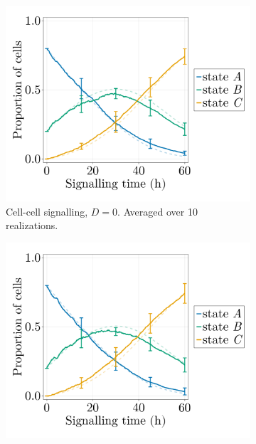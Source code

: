 \begin{figure}[ht]
    \centering
    \begin{subfigure}{0.47\textwidth}
        \centering
        \includegraphics[width=\textwidth]{figures/406/406-proportions-diffgrow-simulation-10ite-fp0-cellcell.png}
        \caption{Cell-cell signalling, $D=0$. Averaged over 10 realizations.}
    \end{subfigure}
    \hfill
    \begin{subfigure}{0.47\textwidth}
        \centering
        \includegraphics[width=\textwidth]{figures/406/406-proportions-diffgrow-simulation-10ite-fp10-cellcell.png}

\end{subfigure}
\end{figure}
